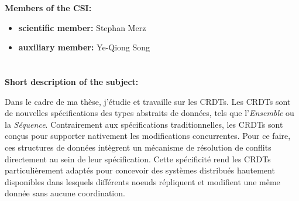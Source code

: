 \documentclass[12pt]{article}
\newcommand{\commentaire}[1]{}
\begin{document}
\noindent\textbf{Members of the CSI:}
\begin{itemize}
\item\textbf{scientific member:}
  Stephan Merz
\item\textbf{auxiliary member:}
  Ye-Qiong Song
\end{itemize}

\newpage
\section*{}

\noindent\textbf{Short description of the subject:}
\commentaire{%
  general context, considered approach, scientific objectives
  compared to the state of the art\\}

Dans le cadre de ma thèse, j'étudie et travaille sur les \acfp{CRDT}.
Les \acp{CRDT} sont de nouvelles spécifications des types abstraits de données, tels que l'\emph{Ensemble} ou la \emph{Séquence}.
Contrairement aux spécifications traditionnelles, les \acp{CRDT} sont conçus pour supporter nativement les modifications concurrentes.
Pour ce faire, ces structures de données intègrent un mécanisme de résolution de conflits directement au sein de leur spécification.
Cette spécificité rend les \acp{CRDT} particulièrement adaptés pour concevoir des systèmes distribués hautement disponibles dans lesquels différents noeuds répliquent et modifient une même donnée sans aucune coordination.
\\
\end{document}
